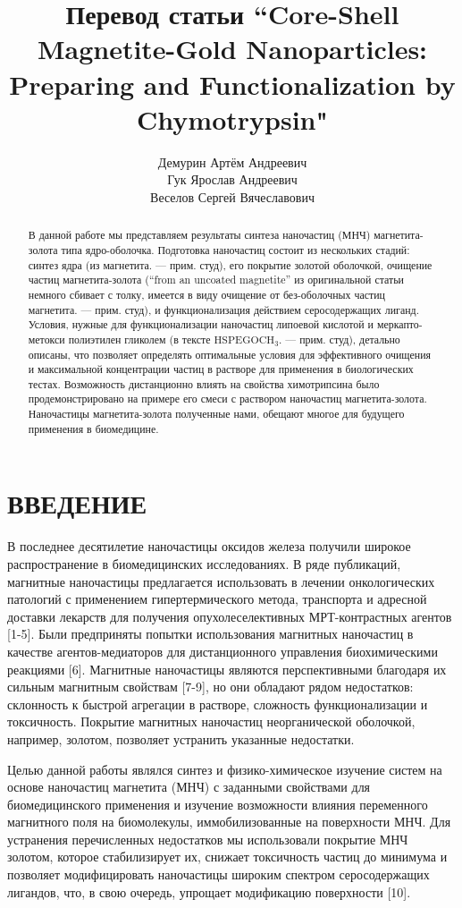 \documentclass[10pt, a4paper]{article}
\title{Перевод статьи ``Core-Shell Magnetite-Gold Nanoparticles: Preparing and Functionalization by Chymotrypsin"}
\author{Демурин Артём Андреевич \\ Гук Ярослав Андреевич  \\ Веселов Сергей Вячеславович}
\date{}
\begin{document}
\maketitle

\begin{abstract}
  В данной работе мы представляем результаты синтеза наночастиц (МНЧ) магнетита-
  золота типа ядро-оболочка. Подготовка наночастиц состоит из нескольких стадий:
  синтез ядра (из магнетита. --- прим. студ), его покрытие золотой оболочкой,
  очищение частиц магнетита-золота (``from an uncoated magnetite'' из оригинальной
  статьи немного сбивает с толку, имеется в виду очищение от без-оболочных частиц
  магнетита. --- прим. студ), и функционализация действием серосодержащих лиганд.
  Условия, нужные для функционализации наночастиц липоевой кислотой и меркапто-метокси
  полиэтилен гликолем (в тексте $\text{HSPEGOCH}_3$. --- прим. студ), детально описаны,
  что позволяет определять оптимальные условия для эффективного очищения и 
  максимальной концентрации частиц в растворе для применения в биологических 
  тестах. Возможность дистанционно влиять на свойства химотрипсина было продемонстрировано
  на примере его смеси с раствором наночастиц магнетита-золота. Наночастицы
  магнетита-золота полученные нами, обещают многое для будущего применения 
  в биомедицине.
\end{abstract}
  
\section*{ВВЕДЕНИЕ}
  В последнее десятилетие наночастицы оксидов железа получили широкое распространение в биомедицинских исследованиях. В ряде публикаций,
  магнитные наночастицы предлагается использовать в лечении онкологических патологий с применением гипертермического метода,
  транспорта и адресной доставки лекарств для получения опухолеселективных МРТ-контрастных агентов [1-5]. Были предприняты попытки использования магнитных наночастиц
  в качестве агентов-медиаторов для дистанционного управления биохимическими реакциями [6]. Магнитные наночастицы являются перспективными благодаря их сильным магнитным свойствам [7-9], но они обладают рядом недостатков: склонность к быстрой агрегации в
  растворе, сложность функционализации и токсичность. Покрытие магнитных наночастиц неорганической оболочкой, например, золотом,
  позволяет устранить указанные недостатки.
  
  Целью данной работы являлся синтез и физико-химическое изучение систем на основе наночастиц магнетита (МНЧ)
  с заданными свойствами для биомедицинского применения и изучение возможности влияния переменного магнитного поля
  на биомолекулы, иммобилизованные на поверхности МНЧ. Для устранения перечисленных недостатков мы использовали покрытие
  МНЧ золотом, которое стабилизирует их, снижает токсичность частиц до минимума и позволяет модифицировать
  наночастицы широким спектром серосодержащих лигандов, что, в свою очередь, упрощает модификацию поверхности [10].
  
\end{document}
